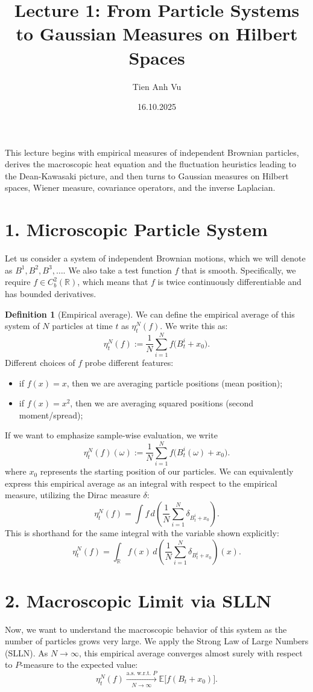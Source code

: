 \documentclass[11pt]{article}
\title{Lecture 1: From Particle Systems to Gaussian Measures on Hilbert Spaces}
\date{16.10.2025}
\author{Tien Anh Vu}
\theoremstyle{definition}
\newtheorem{definition}{Definition}
\theoremstyle{remark}
\begin{document}
\maketitle

This lecture begins with empirical measures of independent Brownian particles, derives the macroscopic heat equation and the fluctuation heuristics leading to the Dean-Kawasaki picture, and then turns to Gaussian measures on Hilbert spaces, Wiener measure, covariance operators, and the inverse Laplacian.

\section*{1. Microscopic Particle System}
Let us consider a system of independent Brownian motions, which we will denote as $B^1, B^2, B^3, \ldots$. We also take a test function $f$ that is smooth. Specifically, we require $f\in C_b^2(\mathbb{R})$, which means that $f$ is twice continuously differentiable and has bounded derivatives.

\begin{definition}[Empirical average]
We can define the empirical average of this system of $N$ particles at time $t$ as $\eta_t^N(f)$. We write this as:
\[
\eta_t^N(f):=\frac{1}{N}\sum_{i=1}^{N} f\bigl(B_t^i+x_0\bigr).
\]
Different choices of $f$ probe different features:
\begin{itemize}
\item if $f(x)=x$, then we are averaging particle positions (mean position);
\item if $f(x)=x^2$, then we are averaging squared positions (second moment/spread);
\end{itemize}
If we want to emphasize sample-wise evaluation, we write
\[
\eta_t^N(f)(\omega):=\frac{1}{N}\sum_{i=1}^{N} f\bigl(B_t^i(\omega)+x_0\bigr).
\]
where $x_0$ represents the starting position of our particles. We can equivalently express this empirical average as an integral with respect to the empirical measure, utilizing the Dirac measure $\delta$:
\[
\eta_t^N(f)=\int f\,d\!\left(\frac{1}{N}\sum_{i=1}^{N}\delta_{B_t^i+x_0}\right).
\]
This is shorthand for the same integral with the variable shown explicitly:
\[
\eta_t^N(f)=\int_{\mathbb R} f(x)\,d\!\left(\frac{1}{N}\sum_{i=1}^{N}\delta_{B_t^i+x_0}\right)(x).
\]
\end{definition}

\section*{2. Macroscopic Limit via SLLN}
Now, we want to understand the macroscopic behavior of this system as the number of particles grows very large. We apply the Strong Law of Large Numbers (SLLN). As $N\to\infty$, this empirical average converges almost surely with respect to $P$-measure to the expected value:
\[
\eta_t^N(f)\xrightarrow[N\to\infty]{\text{a.s. w.r.t. }P}\mathbb{E}\bigl[f(B_t+x_0)\bigr].
\]
\end{document}
